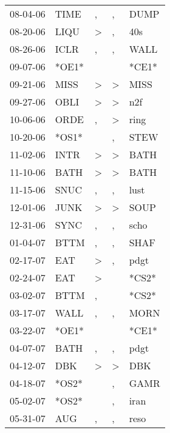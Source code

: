 \begin{supertabular}{lllll}
 08-04-06 &   TIME &                , &                , &   DUMP \\
 08-20-06 &   LIQU &     \textgreater &                , &    40s \\
 08-26-06 &   ICLR &                , &                , &   WALL \\
 09-07-06 &  *OE1* &                  &                  &  *CE1* \\
 09-21-06 &   MISS &     \textgreater &     \textgreater &   MISS \\
 09-27-06 &   OBLI &     \textgreater &     \textgreater &    n2f \\
 10-06-06 &   ORDE &                , &     \textgreater &   ring \\
 10-20-06 &  *OS1* &                  &                , &   STEW \\
 11-02-06 &   INTR &     \textgreater &     \textgreater &   BATH \\
 11-10-06 &   BATH &     \textgreater &     \textgreater &   BATH \\
 11-15-06 &   SNUC &                , &                , &   lust \\
 12-01-06 &   JUNK &     \textgreater &     \textgreater &   SOUP \\
 12-31-06 &   SYNC &                , &                , &   scho \\
 01-04-07 &   BTTM &                , &                , &   SHAF \\
 02-17-07 &    EAT &     \textgreater &                , &   pdgt \\
 02-24-07 &    EAT &     \textgreater &                  &  *CS2* \\
 03-02-07 &   BTTM &                , &                  &  *CS2* \\
 03-17-07 &   WALL &                , &                , &   MORN \\
 03-22-07 &  *OE1* &                  &                  &  *CE1* \\
 04-07-07 &   BATH &                , &                , &   pdgt \\
 04-12-07 &    DBK &     \textgreater &     \textgreater &    DBK \\
 04-18-07 &  *OS2* &                  &                , &   GAMR \\
 05-02-07 &  *OS2* &                  &                , &   iran \\
 05-31-07 &    AUG &                , &                , &   reso \\

\end{supertabular}
